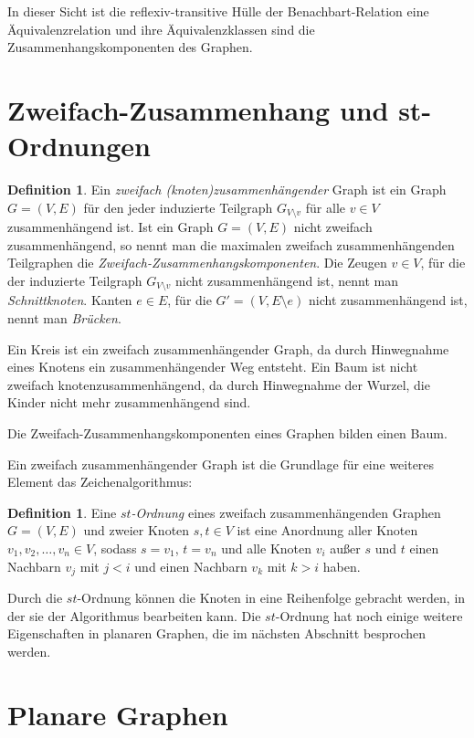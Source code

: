 \documentclass[a4paper]{scrreprt}
\theoremstyle{definition}
\newtheorem{definition}[satz]{Definition}
\begin{document}
In dieser Sicht ist die reflexiv-transitive Hülle der Benachbart-Relation eine Äquivalenzrelation und ihre Äquivalenzklassen sind die Zusammenhangskomponenten des Graphen. %

\section{Zweifach-Zusammenhang und st-Ordnungen}

\begin{definition}
  Ein \emph{zweifach (knoten)zusammenhängender} Graph ist ein Graph $G=(V, E)$ für den jeder induzierte Teilgraph $G_{V \setminus v}$ für alle $v \in V$ zusammenhängend ist.
  Ist ein Graph $G=(V, E)$  nicht zweifach zusammenhängend, so nennt man die maximalen zweifach zusammenhängenden Teilgraphen die \emph{Zweifach-Zusammenhangskomponenten}. Die Zeugen $v \in V$, für die der induzierte Teilgraph $G_{V \setminus v}$ nicht zusammenhängend ist, nennt man \emph{Schnittknoten}. Kanten $e \in E$, für die $G' = (V, E \setminus e)$ nicht zusammenhängend ist, nennt man \emph{Brücken}.
\end{definition}

Ein Kreis ist ein zweifach zusammenhängender Graph, da durch Hinwegnahme eines Knotens ein zusammenhängender Weg entsteht. Ein Baum ist nicht  zweifach knotenzusammenhängend, da durch Hinwegnahme der Wurzel, die Kinder nicht mehr zusammenhängend sind.

Die Zweifach-Zusammenhangskomponenten eines Graphen bilden einen Baum.

Ein zweifach zusammenhängender Graph ist die Grundlage für eine weiteres Element das Zeichenalgorithmus:

\begin{definition}
  Eine \emph{$st$-Ordnung} eines zweifach zusammenhängenden Graphen $G = (V, E)$ und zweier Knoten $s, t \in V$ ist eine Anordnung aller Knoten $v_1, v_2, \dots, v_n \in V$, sodass $s = v_1$, $t = v_n$ und alle Knoten $v_i$ außer $s$ und $t$  einen Nachbarn $v_j$ mit $j < i$ und einen Nachbarn $v_k$ mit $k > i$ haben.
\end{definition}

Durch die $st$-Ordnung können die Knoten in eine Reihenfolge gebracht werden, in der sie der Algorithmus bearbeiten kann. Die $st$-Ordnung hat noch einige weitere Eigenschaften in planaren Graphen, die im nächsten Abschnitt besprochen werden.

\section{Planare Graphen}
\end{document}
